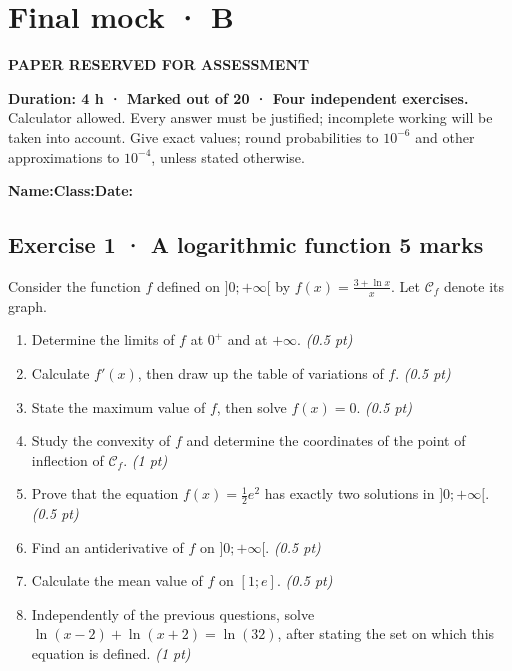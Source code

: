 \fi

\fi

\ifprof

\clearpage{}\label{sujet:9-4}

\section*{Final mock · B}

{\sffamily\bfseries\color{amber}PAPER RESERVED FOR ASSESSMENT\par}

\textbf{Duration: 4 h · Marked out of 20 · Four independent exercises.}\\Calculator allowed. Every answer must be justified; incomplete working will be taken into account. Give exact values; round probabilities to $10^{-6}$ and other approximations to $10^{-4}$, unless stated otherwise.

\smallskip\textbf{Name:}\enspace\dotfill\quad\textbf{Class:}\enspace\dotfill\quad\textbf{Date:}\enspace\dotfill

\subsection*{Exercise 1 · A logarithmic function \hfill 5 marks}Consider the function $f$ defined on $]0;+\infty[$ by $f(x)=\frac{3+\ln x}x$. Let $\mathcal C_f$ denote its graph.

\begin{enumerate}

\item Determine the limits of $f$ at $0^+$ and at $+\infty$. \hfill\textit{(0.5 pt)}

\item Calculate $f' (x)$, then draw up the table of variations of $f$. \hfill\textit{(0.5 pt)}

\item State the maximum value of $f$, then solve $f(x)=0$. \hfill\textit{(0.5 pt)}

\item Study the convexity of $f$ and determine the coordinates of the point of inflection of $\mathcal C_f$. \hfill\textit{(1 pt)}

\item Prove that the equation $f(x)=\frac12 e^{2}$ has exactly two solutions in $]0;+\infty[$. \hfill\textit{(0.5 pt)}

\item Find an antiderivative of $f$ on $]0;+\infty[$. \hfill\textit{(0.5 pt)}

\item Calculate the mean value of $f$ on $[1;e]$. \hfill\textit{(0.5 pt)}

\item Independently of the previous questions, solve $\ln(x-2)+\ln(x+2)=\ln(32)$, after stating the set on which this equation is defined. \hfill\textit{(1 pt)}

\end{enumerate}

